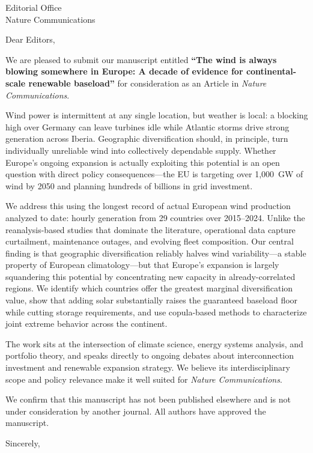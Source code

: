 \documentclass[10pt]{letter}
\begin{document}
\begin{letter}{Editorial Office \\ Nature Communications}

\opening{Dear Editors,}

We are pleased to submit our manuscript entitled \textbf{``The wind is always blowing somewhere in Europe: A decade of evidence for continental-scale renewable baseload''} for consideration as an Article in \emph{Nature Communications}.

Wind power is intermittent at any single location, but weather is local: a blocking high over Germany can leave turbines idle while Atlantic storms drive strong generation across Iberia. Geographic diversification should, in principle, turn individually unreliable wind into collectively dependable supply. Whether Europe's ongoing expansion is actually exploiting this potential is an open question with direct policy consequences---the EU is targeting over 1,000~GW of wind by 2050 and planning hundreds of billions in grid investment.

We address this using the longest record of actual European wind production analyzed to date: hourly generation from 29 countries over 2015--2024. Unlike the reanalysis-based studies that dominate the literature, operational data capture curtailment, maintenance outages, and evolving fleet composition. Our central finding is that geographic diversification reliably halves wind variability---a stable property of European climatology---but that Europe's expansion is largely squandering this potential by concentrating new capacity in already-correlated regions. We identify which countries offer the greatest marginal diversification value, show that adding solar substantially raises the guaranteed baseload floor while cutting storage requirements, and use copula-based methods to characterize joint extreme behavior across the continent.

The work sits at the intersection of climate science, energy systems analysis, and portfolio theory, and speaks directly to ongoing debates about interconnection investment and renewable expansion strategy. We believe its interdisciplinary scope and policy relevance make it well suited for \emph{Nature Communications}.

We confirm that this manuscript has not been published elsewhere and is not under consideration by another journal. All authors have approved the manuscript.

\closing{Sincerely,}

\end{letter}
\end{document}
